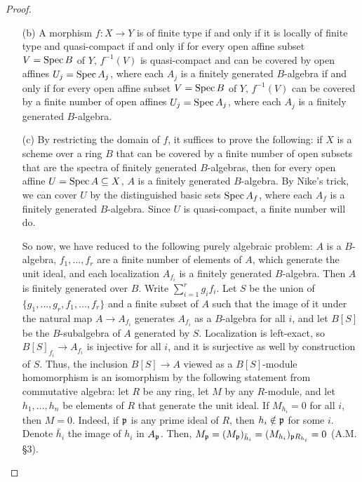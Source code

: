 \documentclass{article}
\begin{document}
\begin{enumerate} [label=\textbf{\arabic*.}, leftmargin=0em]
\begin{proof}
\begin{itemize} [leftmargin=0cm]
    \item[(b)] A morphism $f : X \to Y$ is of finite type if and only if it is locally of finite type and quasi-compact if and only if for every open affine subset $V = \operatorname{Spec}{B}$ of $Y$, $f^{-1}(V)$ is quasi-compact and can be covered by open affines $U_j = \operatorname{Spec}{A_j}$, where each $A_j$ is a finitely generated $B$-algebra if and only if for every open affine subset $V = \operatorname{Spec}{B}$ of $Y$, $f^{-1}(V)$ can be covered by a finite number of open affines $U_j = \operatorname{Spec}{A_j}$, where each $A_j$ is a finitely generated $B$-algebra.

    \item[(c)] By restricting the domain of $f$, it suffices to prove the following: if $X$ is a scheme over a ring $B$ that can be covered by a finite number of open subsets that are the spectra of finitely generated $B$-algebras, then for every open affine $U = \operatorname{Spec}{A} \subseteq X$, $A$ is a finitely generated $B$-algebra. By Nike's trick, we can cover $U$ by the distinguished basic sets $\operatorname{Spec}{A_f}$, where each $A_f$ is a finitely generated $B$-algebra. Since $U$ is quasi-compact, a finite number will do.
    
    So now, we have reduced to the following purely algebraic problem: $A$ is a $B$-algebra, $f_1, \dots, f_r$ are a finite number of elements of $A$, which generate the unit ideal, and each localization $A_{f_i}$ is a finitely generated $B$-algebra. Then $A$ is finitely generated over $B$. Write $\sum_{i = 1}^r g_i f_i$. Let $S$ be the union of $\{ g_1, \dots, g_r, f_1, \dots, f_r \}$ and a finite subset of $A$ such that the image of it under the natural map $A \to A_{f_i}$ generates $A_{f_i}$ as a $B$-algebra for all $i$, and let $B[S]$ be the $B$-subalgebra of $A$ generated by $S$. Localization is left-exact, so $B[S]_{f_i} \to A_{f_i}$ is injective for all $i$, and it is surjective as well by construction of $S$. Thus, the inclusion $B[S] \to A$ viewed as a $B[S]$-module homomorphism is an isomorphism by the following statement from commutative algebra: let $R$ be any ring, let $M$ by any $R$-module, and let $h_1, \dots, h_n$ be elements of $R$ that generate the unit ideal. If $M_{h_i} = 0$ for all $i$, then $M = 0$. Indeed, if $\mathfrak{p}$ is any prime ideal of $R$, then $h_i \notin \mathfrak{p}$ for some $i$. Denote $\bar{h}_i$ the image of $h_i$ in $A_{\mathfrak{p}}$. Then, $M_{\mathfrak{p}} = (M_{\mathfrak{p}})_{\bar{h}_i} = (M_{h_i})_{\mathfrak{p} R_{h_i}} = 0$ (A.M. \S 3).
\end{itemize}
\end{proof}


\end{enumerate}
\end{document}
